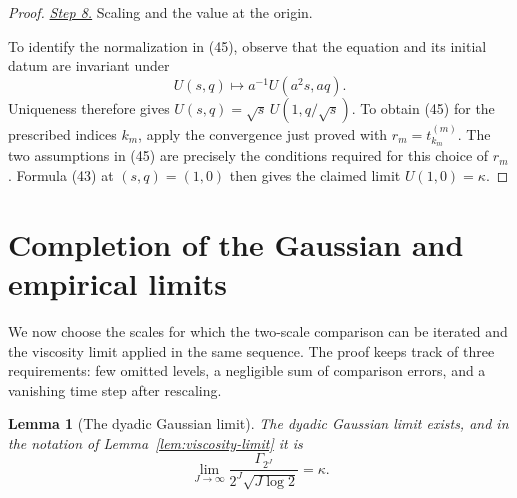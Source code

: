 \documentclass{aomart}
\newtheorem{lemma}[theorem]{Lemma}
\theoremstyle{definition}
\newcommand{\1}{\mathbf 1}
\begin{document}
\begin{proof}
\smallskip\noindent
\underline{\textit{Step 8.}} Scaling and the value at the origin.

To identify the normalization in (45), observe that the equation and
its initial datum are invariant under
\begin{equation*}
U(s,q)\mapsto a^{-1}U(a^2s,aq).
\end{equation*}
Uniqueness therefore gives
$U(s,q)=\sqrt s\,U(1,q/\sqrt s)$.  To obtain (45) for the prescribed
indices $k_m$, apply the convergence just proved with
$r_m=t_{k_m}^{(m)}$.  The two assumptions in (45) are precisely the
conditions required for this choice of $r_m$.  Formula (43) at
$(s,q)=(1,0)$ then gives the claimed limit $U(1,0)=\kappa$.

\end{proof}

\section{Completion of the Gaussian and empirical limits}\label{sec:conclusion}

We now choose the scales for which the two-scale comparison can be iterated
and the viscosity limit applied in the same sequence.  The proof keeps
track of three requirements: few omitted levels, a negligible sum of
comparison errors, and a vanishing time step after rescaling.

\begin{lemma}[The dyadic Gaussian limit]\label{lem:dyadic-gaussian-limit}
The dyadic Gaussian limit exists, and in the notation of Lemma~\ref{lem:viscosity-limit} it is
\begin{equation}
\lim_ {J\to\infty}
\frac{\Gamma_ {2^J}}{2^J\sqrt{J\log2}}=\kappa.
\tag{49}
\end{equation}

\end{lemma}
\end{document}
